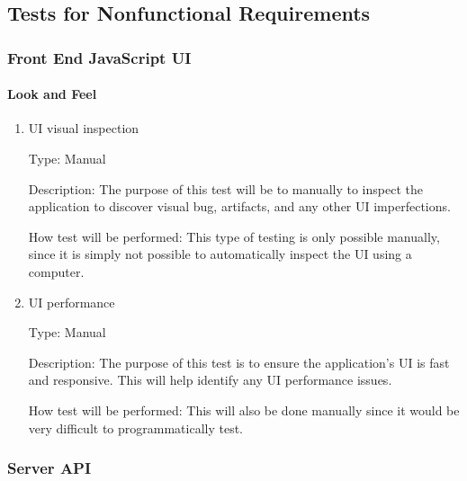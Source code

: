 \documentclass[12pt, titlepage]{article}
\begin{document}
\subsection{Tests for Nonfunctional Requirements}

\subsubsection{Front End JavaScript UI}
		
\paragraph{Look and Feel}

\begin{enumerate}

\item{UI visual inspection\\}

Type: Manual

Description: The purpose of this test will be to manually to inspect the application to
discover visual bug, artifacts, and any other UI imperfections.

How test will be performed: This type of testing is only possible manually,
since it is simply not possible to automatically inspect the UI using a
computer.
					
\item{UI performance\\}

Type: Manual

Description: The purpose of this test is to ensure the application's UI
is fast and responsive. This will help identify any UI performance issues.

How test will be performed: This will also be done manually since it would
be very difficult to programmatically test.

\end{enumerate}

\subsubsection{Server API}
\end{document}
